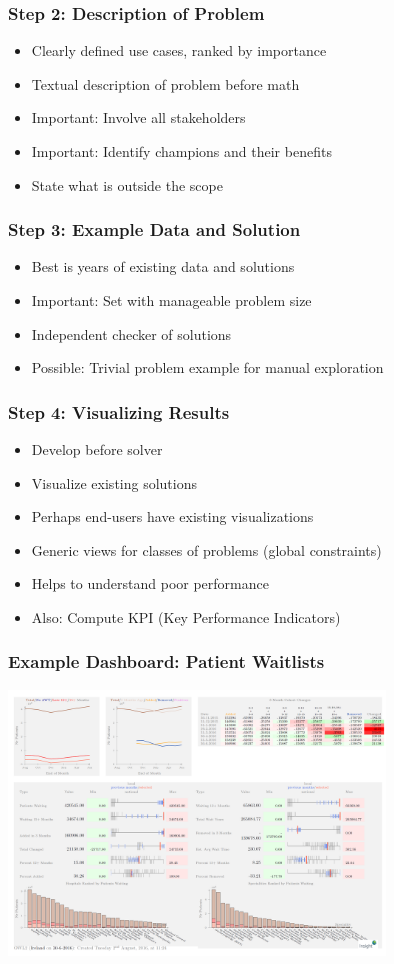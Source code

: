 \begin{frame}
\frametitle{Step 2: Description of Problem}
\begin{itemize}
\item Clearly defined use cases, ranked by importance
\item Textual description of problem before math
\item Important: Involve all stakeholders
\item Important: Identify champions and their benefits
  \item State what is outside the scope
\end{itemize}
\end{frame}

\begin{frame}
\frametitle{Step 3: Example Data and Solution}
\begin{itemize}
\item Best is years of existing data and solutions
\item Important: Set with manageable problem size
\item Independent checker of solutions
  \item Possible: Trivial problem example for manual exploration
\end{itemize}
\end{frame}

\begin{frame}
\frametitle{Step 4: Visualizing Results}
\begin{itemize}
\item Develop before solver
\item Visualize existing solutions
\item Perhaps end-users have existing visualizations
\item Generic views for classes of problems (global constraints)
  \item Helps to understand poor performance
  \item Also: Compute KPI (Key Performance Indicators)
\end{itemize}
\end{frame}

\begin{frame}
  \frametitle{Example Dashboard: Patient Waitlists}
  \includegraphics[width=10cm]{../methodology/images/ntpf}
  \end{frame}

